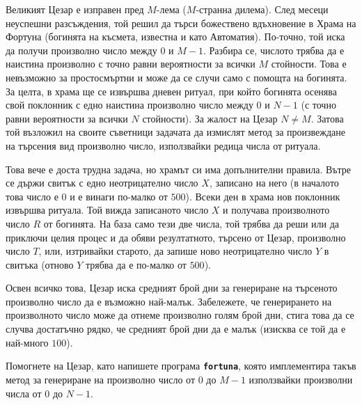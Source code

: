 \documentclass[12pt]{article}
\begin{document}
\renewcommand{\tl}{$1$ сек.}
\renewcommand{\ml}{$1024$ MB}
\renewcommand{\header}{
	XLII НАЦИОНАЛНА ОЛИМПИАДА ПО ИНФОРМАТИКА\\
	Национален кръг\\
	Варна, 13 – 16 март 2026 г.\\
	Група AB, 9 – 12 клас, Ден 2\\
	\vspace{0.1cm}
}

Великият Цезар е изправен пред $M$-лема ($M$-странна дилема). След месеци неуспешни разсъждения, той решил да търси божествено вдъхновение в Храма на Фортуна (богинята на късмета, известна и като Автоматия). По-точно, той иска да получи произволно число между $0$ и $M-1$. Разбира се, числото трябва да е наистина произволно с точно равни вероятности за всички $M$ стойности. Това е невъзможно за простосмъртни и може да се случи само с помощта на богинята. За целта, в храма ще се извършва дневен ритуал, при който богинята осенява свой поклонник с едно наистина произволно число между $0$ и $N-1$ (с точно равни вероятности за всички $N$ стойности). За жалост на Цезар $N \neq M$. Затова той възложил на своите съветници задачата да измислят метод за произвеждане на търсения вид произволно число, използвайки редица числа от ритуала.

Това вече е доста трудна задача, но храмът си има допълнителни правила. Вътре се държи свитък с едно неотрицателно число $X$, записано на него (в началото това число е $0$ и е винаги по-малко от $500$). Всеки ден в храма нов поклонник извършва ритуала. Той вижда записаното число $X$ и получава произволното число $R$ от богинята. На база само тези две числа, той трябва да реши или да приключи целия процес и да обяви резултатното, търсено от Цезар, произволно число $T$, или, изтривайки старото, да запише ново неотрицателно число $Y$ в свитъка (отново $Y$ трябва да е по-малко от $500$).

Освен всичко това, Цезар иска средният брой дни за генериране на търсеното произволно число да е възможно най-малък. Забележете, че генерирането на произволното число може да отнеме произволно голям брой дни, стига това да се случва достатъчно рядко, че средният брой дни да е малък (изисква се той да е най-много $100$).

Помогнете на Цезар, като напишете програма \textbf{\texttt{fortuna}}, която имплементира такъв метод за генериране на произволно число от $0$ до $M-1$ използвайки произволни числа от $0$ до $N-1$.
\end{document}
